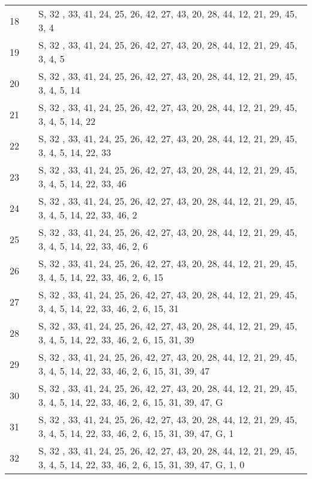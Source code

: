 \begin{landscape}
\begin{table}
\begin{tabular}{l|ll}
18   &            &  S, 32 , 33, 41, 24, 25, 26, 42, 27, 43, 20, 28, 44, 12, 21, 29, 45, 3, 4         \\
19   &            & S, 32 , 33, 41, 24, 25, 26, 42, 27, 43, 20, 28, 44, 12, 21, 29, 45, 3, 4, 5          \\
20   &            &  S, 32 , 33, 41, 24, 25, 26, 42, 27, 43, 20, 28, 44, 12, 21, 29, 45, 3, 4, 5, 14        \\
21   &            & S, 32 , 33, 41, 24, 25, 26, 42, 27, 43, 20, 28, 44, 12, 21, 29, 45, 3, 4, 5, 14, 22           \\
22   &            & S, 32 , 33, 41, 24, 25, 26, 42, 27, 43, 20, 28, 44, 12, 21, 29, 45, 3, 4, 5, 14, 22, 33         \\
23   &            & S, 32 , 33, 41, 24, 25, 26, 42, 27, 43, 20, 28, 44, 12, 21, 29, 45, 3, 4, 5, 14, 22, 33, 46          \\
24   &            & S, 32 , 33, 41, 24, 25, 26, 42, 27, 43, 20, 28, 44, 12, 21, 29, 45, 3, 4, 5, 14, 22, 33, 46, 2         \\
25   &            & S, 32 , 33, 41, 24, 25, 26, 42, 27, 43, 20, 28, 44, 12, 21, 29, 45, 3, 4, 5, 14, 22, 33, 46, 2, 6         \\
26   &            & S, 32 , 33, 41, 24, 25, 26, 42, 27, 43, 20, 28, 44, 12, 21, 29, 45, 3, 4, 5, 14, 22, 33, 46, 2, 6, 15          \\
27   &            & S, 32 , 33, 41, 24, 25, 26, 42, 27, 43, 20, 28, 44, 12, 21, 29, 45, 3, 4, 5, 14, 22, 33, 46, 2, 6, 15, 31         \\
28   &            &  S, 32 , 33, 41, 24, 25, 26, 42, 27, 43, 20, 28, 44, 12, 21, 29, 45, 3, 4, 5, 14, 22, 33, 46, 2, 6, 15, 31, 39        \\
29   &            &  S, 32 , 33, 41, 24, 25, 26, 42, 27, 43, 20, 28, 44, 12, 21, 29, 45, 3, 4, 5, 14, 22, 33, 46, 2, 6, 15, 31, 39, 47        \\
30   &            &  S, 32 , 33, 41, 24, 25, 26, 42, 27, 43, 20, 28, 44, 12, 21, 29, 45, 3, 4, 5, 14, 22, 33, 46, 2, 6, 15, 31, 39, 47, G        \\
31   &            & S, 32 , 33, 41, 24, 25, 26, 42, 27, 43, 20, 28, 44, 12, 21, 29, 45, 3, 4, 5, 14, 22, 33, 46, 2, 6, 15, 31, 39, 47, G, 1        \\
32   &            & S, 32 , 33, 41, 24, 25, 26, 42, 27, 43, 20, 28, 44, 12, 21, 29, 45, 3, 4, 5, 14, 22, 33, 46, 2, 6, 15, 31, 39, 47, G, 1, 0        
\end{tabular}
\end{table}

\end{landscape}